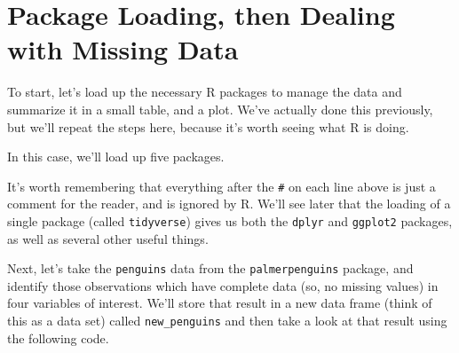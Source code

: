 \documentclass[
]{book}
\newenvironment{Shaded}{\begin{snugshade}}{\end{snugshade}}
\newcommand{\CommentTok}[1]{\textcolor[rgb]{0.56,0.35,0.01}{\textit{#1}}}
\newcommand{\KeywordTok}[1]{\textcolor[rgb]{0.13,0.29,0.53}{\textbf{#1}}}
\newcommand{\NormalTok}[1]{#1}
\newcommand{\OperatorTok}[1]{\textcolor[rgb]{0.81,0.36,0.00}{\textbf{#1}}}
\newcommand{\StringTok}[1]{\textcolor[rgb]{0.31,0.60,0.02}{#1}}
\begin{document}
\hypertarget{package-loading-then-dealing-with-missing-data}{%
\section{Package Loading, then Dealing with Missing Data}\label{package-loading-then-dealing-with-missing-data}}

To start, let's load up the necessary R packages to manage the data and summarize it in a small table, and a plot. We've actually done this previously, but we'll repeat the steps here, because it's worth seeing what R is doing.

In this case, we'll load up five packages.

\begin{Shaded}
\end{Shaded}

It's worth remembering that everything after the \texttt{\#} on each line above is just a comment for the reader, and is ignored by R. We'll see later that the loading of a single package (called \texttt{tidyverse}) gives us both the \texttt{dplyr} and \texttt{ggplot2} packages, as well as several other useful things.

Next, let's take the \texttt{penguins} data from the \texttt{palmerpenguins} package, and identify those observations which have complete data (so, no missing values) in four variables of interest. We'll store that result in a new data frame (think of this as a data set) called \texttt{new\_penguins} and then take a look at that result using the following code.

\begin{Shaded}
\end{Shaded}
\end{document}
